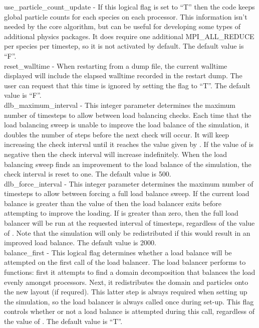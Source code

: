 {\emphtext use\_particle\_count\_update} - If this logical flag is set to
  ``T'' then the code keeps global particle counts for each species on each
  processor. This information isn't needed by the core
  algorithm, but can be useful for developing some types of additional physics
  packages. It does require one additional MPI\_ALL\_REDUCE per species per
  timestep, so it is not activated by default.
  The default value is ``F''.\\

{\emphtext reset\_walltime} - When restarting from a dump file, the current
  walltime displayed will include the elapsed walltime recorded in the
  restart dump. The user can request that this time is ignored by setting
  the  flag to ``T''.
  The default value is ``F''.\\

{\emphtext dlb\_maximum\_interval} - This integer parameter determines the
  maximum number of timesteps to allow between load balancing checks.
  Each time that the load balancing sweep is unable to improve the load
  balance of the simulation, it doubles the number of steps before the
  next check will occur. It will keep increasing the check interval until
  it reaches the value given by . If the
  value of  is negative then the check
  interval will increase
  indefinitely. When the load balancing sweep finds an improvement to the
  load balance of the simulation, the check interval is reset to one.
  The default value is 500.\\

{\emphtext dlb\_force\_interval} - This integer parameter determines the
  maximum number of timesteps
  to allow between forcing a full load balance sweep.
  If the current load balance is greater than the value of
  then the load balancer exits before attempting to improve the loading.
  If  is greater than zero, then the full load
  balancer will be run at the requested interval of timesteps, regardless
  of the value of . Note that the simulation will
  only be redistributed if this would result in an improved load balance.
  The default value is 2000.\\

{\emphtext balance\_first} - This logical flag determines whether a load balance
  will be attempted on the first call of the load balancer.
  The load balancer performs to functions: first it attempts to find a
  domain decomposition that balances the load evenly amongst processors.
  Next, it redistributes the domain and particles onto the new layout (if
  requred). This latter step is always required when setting up the
  simulation, so the load balancer is always called once during set-up.
  This flag controls whether or not a load balance is attempted during
  this call, regardless of the value of .
  The default value is ``T''.\\


